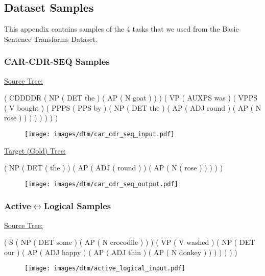 \subsection{Dataset Samples} \label{sec:dtm-dataset-samples}
This appendix contains samples of the 4 tasks that we used from the Basic Sentence Transforms Dataset.

\subsubsection{\textbf{CAR-CDR-SEQ} Samples}

\underline{Source Tree:}

\hspace{.15in} ( CDDDDR ( NP ( DET the ) ( AP ( N goat ) ) ) ( VP ( AUXPS was ) ( VPPS ( V bought ) ( PPPS ( PPS by ) ( NP ( DET the ) ( AP ( ADJ round ) ( AP ( N rose ) ) ) ) ) ) ) )	

\begin{figure}[H]
\vskip 0.2in
\begin{center}
\centerline{\texttt{[image: images/dtm/car\_cdr\_seq\_input.pdf]}}
\end{center}
\vskip -0.2in
\end{figure}

\underline{Target (Gold) Tree:}

\hspace{.15in}( NP ( DET ( the ) ) ( AP ( ADJ ( round ) ) ( AP ( N ( rose ) ) ) ) )

\begin{figure}[H]
\vskip 0.2in
\begin{center}
\centerline{\texttt{[image: images/dtm/car\_cdr\_seq\_output.pdf]}}
\end{center}
\vskip -0.2in
\end{figure}

\subsubsection{\textbf{Active$\leftrightarrow$Logical} Samples}

\underline{Source Tree:}

\hspace{.15in} ( S ( NP ( DET some ) ( AP ( N crocodile ) ) ) ( VP ( V washed ) ( NP ( DET our ) ( AP ( ADJ happy ) ( AP ( ADJ thin ) ( AP ( N donkey ) ) ) ) ) ) )	

\begin{figure}[H]
\vskip 0.2in
\begin{center}
\centerline{\texttt{[image: images/dtm/active\_logical\_input.pdf]}}
\end{center}
\vskip -0.2in
\end{figure}

